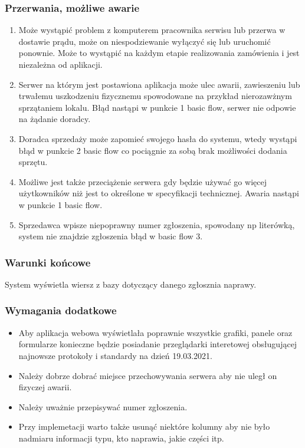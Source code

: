 \documentclass{article}
\begin{document}
\subsubsection{Przerwania, możliwe awarie}
\begin{enumerate}
    \item Może wystąpić problem z komputerem pracownika serwisu lub przerwa w dostawie prądu, może on niespodziewanie wyłączyć się lub uruchomić ponownie. Może to wystąpić na każdym etapie realizowania zamówienia i jest niezależna od aplikacji.
    \item Serwer na którym jest postawiona aplikacja może ulec awarii, zawieszeniu lub trwałemu uszkodzeniu fizycznemu spowodowane na przykład nierozawżnym sprzątaniem lokalu. Błąd nastąpi w punkcie 1 basic flow, serwer nie odpowie na żądanie doradcy.
    \item Doradca sprzedaży może zapomieć swojego hasła do systemu, wtedy wystąpi błąd w punkcie 2 basic flow co pociągnie za sobą brak możliwości dodania sprzętu.
    \item Możliwe jest także przeciążenie serwera gdy będzie używać go więcej użytkowników niż jest to określone w specyfikacji technicznej. Awaria nastąpi w punkcie 1 basic flow.
    \item Sprzedawca wpisze niepoprawny numer zgłoszenia, spowodany np literówką, system nie znajdzie zgłoszenia błąd w basic flow 3.
\end{enumerate}
\subsubsection{Warunki końcowe}
System wyświetla wiersz z bazy dotyczący danego zgłosznia naprawy.
\subsubsection{Wymagania dodatkowe}
\begin{itemize}
    \item Aby aplikacja webowa wyświetlała poprawnie wszystkie grafiki, panele oraz formularze konieczne będzie posiadanie przeglądarki interetowej obsługującej najnowsze protokoły i standardy na dzień 19.03.2021.
    \item Należy dobrze dobrać miejsce przechowywania serwera aby nie uległ on fizyczej awarii.
    \item Należy uważnie przepisywać numer zgłoszenia.
    \item Przy implemetacji warto także usunąć niektóre kolumny aby nie było nadmiaru informacji typu, kto naprawia, jakie części itp.
\end{itemize}
\end{document}

